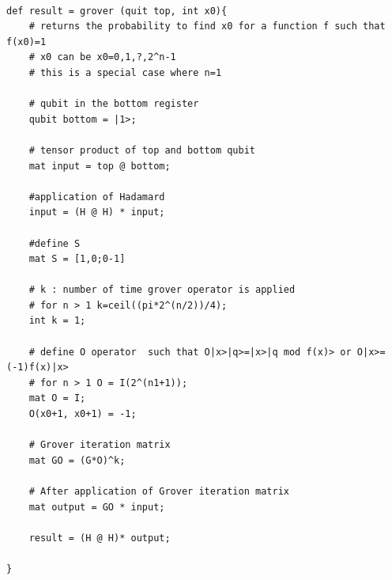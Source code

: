 \begin{lstlisting}

def result = grover (quit top, int x0){
	# returns the probability to find x0 for a function f such that f(x0)=1
	# x0 can be x0=0,1,?,2^n-1
	# this is a special case where n=1
	
	# qubit in the bottom register
	qubit bottom = |1>;
	
	# tensor product of top and bottom qubit
	mat input = top @ bottom;
	
	#application of Hadamard
	input = (H @ H) * input;
	
	#define S
	mat S = [1,0;0-1]
	
	# k : number of time grover operator is applied
	# for n > 1 k=ceil((pi*2^(n/2))/4);
	int k = 1;
	
	# define O operator  such that O|x>|q>=|x>|q mod f(x)> or O|x>=(-1)f(x)|x> 
	# for n > 1 O = I(2^(n1+1));
	mat O = I;
	O(x0+1, x0+1) = -1;
	
	# Grover iteration matrix
	mat GO = (G*O)^k;
	
	# After application of Grover iteration matrix
	mat output = GO * input;
	
	result = (H @ H)* output;
	
}

\end{lstlisting}
